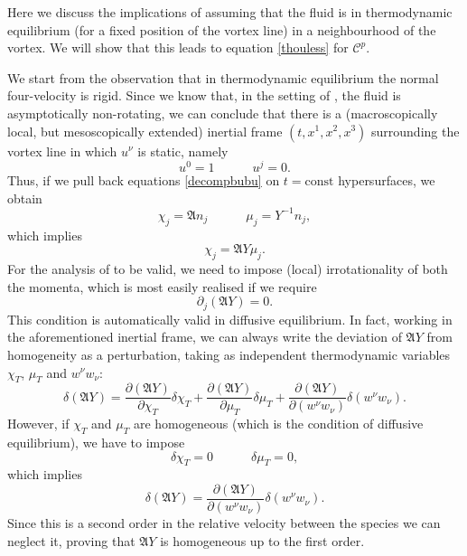 \documentclass[preprints,article,accept,moreauthors,pdftex]{mdpi}
\newcommand{\spc}{\quad \quad \quad}
\begin{document}
Here we discuss the implications of assuming that the fluid is in thermodynamic equilibrium (for a fixed position of the vortex line) in a neighbourhood of the vortex. We will show that this leads to equation \eqref{thouless} for $\mathcal{C}^p$. 

We start from the observation that in thermodynamic equilibrium the normal four-velocity is rigid. Since we know that, in the setting of \cite{Carter_Prix_Magnus}, the fluid is asymptotically non-rotating, we can conclude that there is a (macroscopically local, but mesoscopically extended) inertial frame $(t,x^1,x^2,x^3)$ surrounding the vortex line in which $u^\nu$ is static, namely
\begin{equation}
u^0 =1  \spc  u^j=0.
\end{equation}
Thus, if we pull back equations \eqref{decompbubu} on $t=\text{const}$ hypersurfaces, we obtain
\begin{equation}
\chi_j =\mathfrak{A}n_j  \spc \mu_j = Y^{-1} n_j,
\end{equation}
which implies
\begin{equation}\label{cccchhh}
\chi_j = \mathfrak{A}Y \mu_j.
\end{equation}
For the analysis of \cite{Carter_Prix_Magnus} to be valid, we need to impose (local) irrotationality of both the momenta, which is most easily realised if we require 
\begin{equation}\label{partialll}
\partial_j (\mathfrak{A}Y)=0.
\end{equation}
This condition is automatically valid in diffusive equilibrium. In fact, working in the aforementioned inertial frame, we can always write the deviation of $\mathfrak{A}Y$ from homogeneity as a perturbation, taking as independent thermodynamic variables $\chi_T$, $\mu_T$ and $w^\nu w_\nu$:
\begin{equation}
\delta (\mathfrak{A}Y) = \dfrac{\partial (\mathfrak{A}Y)}{\partial \chi_T} \delta \chi_T + \dfrac{\partial (\mathfrak{A}Y)}{\partial \mu_T} \delta \mu_T + \dfrac{\partial (\mathfrak{A}Y)}{\partial (w^\nu w_\nu)} \delta (w^\nu w_\nu) . 
\end{equation}
However, if $\chi_T$ and $\mu_T$ are homogeneous (which is the condition of diffusive equilibrium), we have to impose
\begin{equation}
\delta \chi_T =0  \spc \delta \mu_T =0,
\end{equation}
which implies
\begin{equation}
\delta (\mathfrak{A}Y)  = \dfrac{\partial (\mathfrak{A}Y)}{\partial (w^\nu w_\nu)} \delta (w^\nu w_\nu).
\end{equation}
Since this is a second order in the relative velocity between the species we can neglect it, proving that $\mathfrak{A}Y$ is homogeneous up to the first order.
\end{document}
